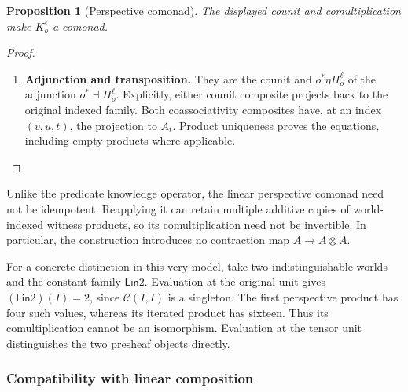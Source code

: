 \documentclass[11pt,a4paper]{article}
\numberwithin{equation}{section}
\newtheorem{proposition}[theorem]{Proposition}
\theoremstyle{definition}
\theoremstyle{remark}
\theoremstyle{plain}
\providecommand{\Lin}{\mathsf{Lin}}
\providecommand{\cC}{\mathcal{C}}
\begin{document}
\begin{proposition}[Perspective comonad]
\label{agt-prop-perspective-comonad}
The displayed counit and comultiplication make $K_o^\ell$ a comonad.
\end{proposition}
\begin{proof}
\leavevmode
\begin{enumerate}[label=\textup{(\arabic*)},leftmargin=*,itemsep=4pt,topsep=3pt]
  \item \textbf{Adjunction and transposition.} They are the counit and $o^*\eta\Pi_o^\ell$ of the adjunction
$o^*\dashv\Pi_o^\ell$. Explicitly, either counit composite projects back
to the original indexed family. Both coassociativity composites have, at
an index $(v,u,t)$, the projection to $A_t$. Product uniqueness proves
the equations, including empty products where applicable.
\end{enumerate}
\end{proof}

Unlike the predicate knowledge operator, the linear perspective
comonad need not be idempotent. Reapplying it can retain multiple
additive copies of world-indexed witness products, so its
comultiplication need not be invertible. In particular, the construction
introduces no contraction map $A\to A\otimes A$.

For a concrete distinction in this very model, take two indistinguishable
worlds and the constant family $\Lin 2$. Evaluation at the original unit
gives $(\Lin2)(I)=2$, since $\cC(I,I)$ is a singleton. The first perspective
product has four such values, whereas its iterated product has sixteen.
Thus its comultiplication cannot be an isomorphism. Evaluation at the tensor unit distinguishes the two presheaf objects directly.

\subsubsection{Compatibility with linear composition}
\end{document}
